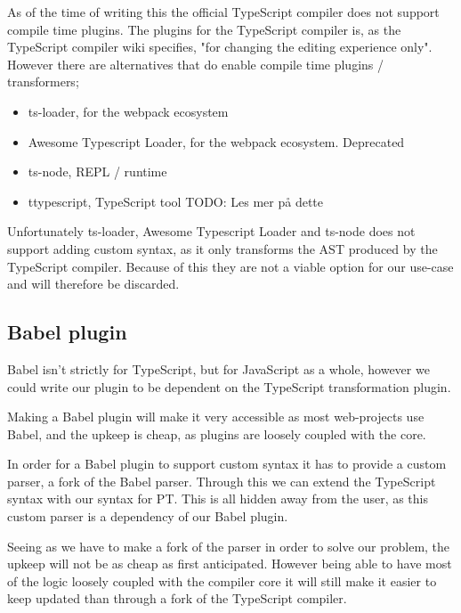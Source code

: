 As of the time of writing this the official TypeScript compiler does not support compile time plugins. The plugins for the TypeScript compiler is, as the TypeScript compiler wiki specifies, "for changing the editing experience only"\cite{tscplugin}.
However there are alternatives that do enable compile time plugins / transformers;

\begin{itemize}
    \item ts-loader\cite{tsloadergithub}, for the webpack ecosystem
    \item Awesome Typescript Loader\cite{awesometypescriptloadergithub}, for the webpack ecosystem. Deprecated
    \item ts-node\cite{tsnodegithub}, REPL / runtime
    \item ttypescript\cite{ttypescriptgithub}, TypeScript tool TODO: Les mer på dette
\end{itemize}

Unfortunately ts-loader, Awesome Typescript Loader and ts-node does not support adding custom syntax, as it only transforms the AST produced by the TypeScript compiler.
Because of this they are not a viable option for our use-case and will therefore be discarded.

\subsection{Babel plugin}\label{subsec:babel-plugin}

Babel isn't strictly for TypeScript, but for JavaScript as a whole, however we could write our plugin to be dependent on the TypeScript transformation plugin.

Making a Babel plugin will make it very accessible as most web-projects use Babel, and the upkeep is cheap, as plugins are loosely coupled with the core.

In order for a Babel plugin to support custom syntax it has to provide a custom parser, a fork of the Babel parser.
Through this we can extend the TypeScript syntax with our syntax for PT.
This is all hidden away from the user, as this custom parser is a dependency of our Babel plugin.

Seeing as we have to make a fork of the parser in order to solve our problem, the upkeep will not be as cheap as first anticipated.
However being able to have most of the logic loosely coupled with the compiler core it will still make it easier to keep updated than through a fork of the TypeScript compiler.

